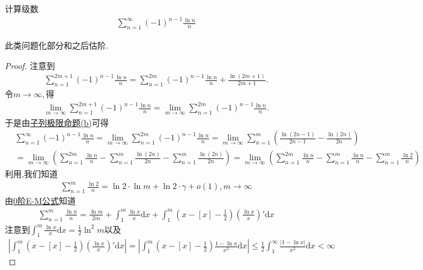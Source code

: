 \documentclass[../../main.tex]{subfiles}
\begin{document}
\begin{example}
计算级数
\begin{align*}
\sum_{n=1}^{\infty} (-1)^{n - 1} \frac{\ln n}{n}
\end{align*}
\end{example}
\begin{note}
此类问题化部分和之后估阶.
\end{note}
\begin{proof}
注意到
\begin{align*}
\sum_{n=1}^{2m+1}{\left( -1 \right) ^{n-1}\frac{\ln n}{n}}=\sum_{n=1}^{2m}{\left( -1 \right) ^{n-1}\frac{\ln n}{n}}+\frac{\ln \left( 2m+1 \right)}{2m+1}.
\end{align*}
令$m\rightarrow \infty ,$得
\begin{align*}
\underset{m\rightarrow \infty}{\lim}\sum_{n=1}^{2m+1}{\left( -1 \right) ^{n-1}\frac{\ln n}{n}}=\underset{m\rightarrow \infty}{\lim}\sum_{n=1}^{2m}{\left( -1 \right) ^{n-1}\frac{\ln n}{n}}.
\end{align*}
于是由\hyperref[proposition:子列极限命题]{子列极限命题(b)}可得
\begin{align*}
&\sum_{n=1}^{\infty} (-1)^{n - 1} \frac{\ln n}{n} = \lim_{m \to \infty} \sum_{n=1}^{2m} (-1)^{n - 1} \frac{\ln n}{n} = \lim_{m \to \infty} \sum_{n=1}^{m} \left( \frac{\ln(2n - 1)}{2n - 1} - \frac{\ln(2n)}{2n} \right) \\
&= \lim_{m \to \infty} \left( \sum_{n=1}^{2m} \frac{\ln n}{n} - \sum_{n=1}^{m} \frac{\ln(2n)}{2n} - \sum_{n=1}^{m} \frac{\ln(2n)}{2n} \right) = \lim_{m \to \infty} \left( \sum_{n=1}^{2m} \frac{\ln n}{n} - \sum_{n=1}^{m} \frac{\ln n}{n} - \sum_{n=1}^{m} \frac{\ln 2}{n} \right)
\end{align*}
利用,我们知道
\begin{align*}
\sum_{n=1}^{m} \frac{\ln 2}{n} = \ln 2 \cdot \ln m + \ln 2 \cdot \gamma + o(1), m \to \infty
\end{align*}
由\hyperref[proposition:0阶欧拉麦克劳林公式(0阶E-M公式)]{0阶E-M公式}知道
\begin{align*}
\sum_{n=1}^{m} \frac{\ln n}{n} = \frac{\ln m}{2m} + \int_{1}^{m} \frac{\ln x}{x} \mathrm{d}x + \int_{1}^{m} \left( x - [x] - \frac{1}{2} \right) \left( \frac{\ln x}{x} \right)' \mathrm{d}x
\end{align*}
注意到$\int_{1}^{m} \frac{\ln x}{x} \mathrm{d}x = \frac{1}{2} \ln^2 m$以及
\begin{align*}
\left| \int_{1}^{m} \left( x - [x] - \frac{1}{2} \right) \left( \frac{\ln x}{x} \right)' \mathrm{d}x \right| = \left| \int_{1}^{m} \left( x - [x] - \frac{1}{2} \right) \frac{1 - \ln x}{x^2} \mathrm{d}x \right| \leqslant \frac{1}{2} \int_{1}^{\infty} \frac{|1 - \ln x|}{x^2} \mathrm{d}x < \infty

\end{align*}
\end{proof}
\end{document}
